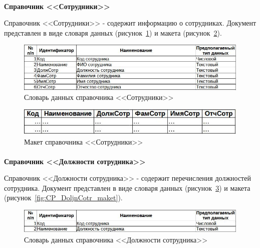 \documentclass[12pt, a4paper, simple]{eskdtext}
\begin{document}
    \paragraph{} \textbf{Справочник <<Сотрудники>>}

    Справочник <<Сотрудники>> - содержит информацию о сотрудниках.
    Документ представлен в виде словаря данных (рисунок~\ref{fig:CP_Sotr_tipi})
    и макета (рисунок~\ref{fig:CP_Sotr_maket}).

    \begin{figure}[!h]
        \centering
        \includegraphics[width=14cm]
            {_docs/СП_Сотр_типы.jpg}
        \caption{Словарь данных справочника <<Сотрудники>>}
        \label{fig:CP_Sotr_tipi}
    \end{figure}

    \begin{figure}[!h]
        \centering
        \includegraphics[]
            {_docs/СП_Сотр_макет.jpg}
        \caption{Макет справочника <<Сотрудники>>}
        \label{fig:CP_Sotr_maket}
    \end{figure}

    \newpage

    \paragraph{} \textbf{Справочник <<Должности сотрудника>>}

    Справочник <<Должности сотрудника>> - содержит перечисления должностей сотрудника.
    Документ представлен в виде словаря данных (рисунок~\ref{fig:CP_DoljnCotr_tipi})
    и макета (рисунок~\ref{fig:CP_DoljnCotr_maket}).

    \begin{figure}[!h]
        \centering
        \includegraphics[width=14cm]
            {_docs/СП_ДолжнСотр_типы.jpg}
        \caption{Словарь данных справочника <<Должности сотрудника>>}
        \label{fig:CP_DoljnCotr_tipi}
    \end{figure}
\end{document}
